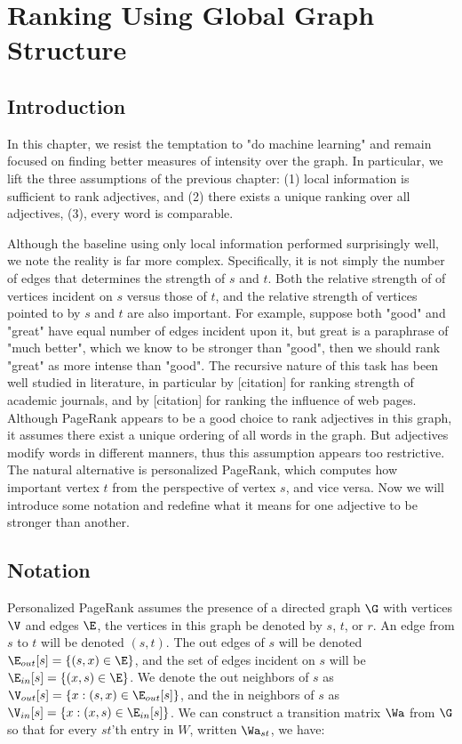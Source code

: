 \section{Ranking Using Global Graph Structure}

\subsection{Introduction}


In this chapter, we resist the temptation to "do machine learning" and remain focused on finding better measures of intensity over the graph. In particular, we lift the three assumptions of the previous chapter: (1) local information is sufficient to rank adjectives, and (2) there exists a unique ranking over all adjectives, (3), every word is comparable.

Although the baseline using only local information performed surprisingly well, we note the reality is far more complex. Specifically, it is not simply the number of edges that determines the strength of $s$ and $t$. Both the relative strength of of vertices incident on $s$ versus those of $t$, and the relative strength of vertices pointed to by $s$ and $t$ are also important. For example, suppose both "good" and "great" have equal number of edges incident upon it, but great is a paraphrase of "much better", which we know to be stronger than "good", then we should rank "great" as more intense than "good". The recursive nature of this task has been well studied in literature, in particular by [citation] for ranking strength of academic journals, and by [citation] for ranking the influence of web pages. Although PageRank appears to be a good choice to rank adjectives in this graph, it assumes there exist a unique ordering of all words in the graph. But adjectives modify words in different manners, thus this assumption appears too restrictive. The natural alternative is personalized PageRank, which computes how important vertex $t$ from the perspective of vertex $s$, and vice versa. Now we will introduce some notation and redefine what it means for one adjective to be stronger than another. 

\subsection{Notation}

Personalized PageRank assumes the presence of a directed graph $\G$ with vertices $\V$ and edges $\E$, the vertices in this graph be denoted by $s$, $t$, or $r$. An edge from $s$ to $t$ will be denoted $(s,t)$. The out edges of $s$ will be denoted $\E_{out}[s] = \{ (s,x) \in \E\}$, and the set of edges incident on $s$ will be $\E_{in}[s] = \{ (x, s) \in \E\}$. We denote the out neighbors of $s$ as $\V_{out}[s] = \{ x  : (s,x) \in \E_{out}[s] \}$, and the in neighbors of $s$ as $\V_{in}[s] = \{ x : (x,s) \in \E_{in}[s] \}$. We can construct a transition matrix $\Wa$ from $\G$ so that for every $st$'th entry in $W$, written $\Wa_{st}$, we have:

